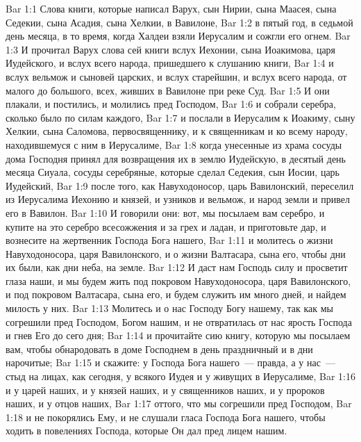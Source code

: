 \vs Bar 1:1 Слова книги, которые написал Варух, сын Нирии, сына Маасея, сына Седекии, сына Асадия, сына Хелкии, в Вавилоне,
\vs Bar 1:2 в пятый год, в седьмой день месяца, в то время, когда Халдеи взяли Иерусалим и сожгли его огнем.
\vs Bar 1:3 И прочитал Варух слова сей книги вслух Иехонии, сына Иоакимова, царя Иудейского, и вслух всего народа, пришедшего к слушанию книги,
\vs Bar 1:4 и вслух вельмож и сыновей царских, и вслух старейшин, и вслух всего народа, от малого до большого, всех, живших в Вавилоне при реке Суд.
\vs Bar 1:5 И они плакали, и постились, и молились пред Господом,
\vs Bar 1:6 и собрали серебра, сколько было по силам каждого,
\vs Bar 1:7 и послали в Иерусалим к Иоакиму, сыну Хелкии, сына Саломова, первосвященнику, и к священникам и ко всему народу, находившемуся с ним в Иерусалиме,
\vs Bar 1:8 когда  унесенные из храма сосуды дома Господня принял для возвращения их в землю Иудейскую, в десятый день месяца Сиуала, сосуды серебряные, которые сделал Седекия, сын Иосии, царь Иудейский,
\vs Bar 1:9 после того, как Навуходоносор, царь Вавилонский, переселил из Иерусалима Иехонию и князей, и узников и вельмож, и народ земли и привел его в Вавилон.
\rsbpar\vs Bar 1:10 И говорили они: вот, мы посылаем вам серебро, и купите на это серебро всесожжения и  за грех и ладан, и приготовьте дар, и вознесите на жертвенник Господа Бога нашего,
\vs Bar 1:11 и молитесь о жизни Навуходоносора, царя Вавилонского, и о жизни Валтасара, сына его, чтобы дни их были, как дни неба, на земле.
\vs Bar 1:12 И даст нам Господь силу и просветит глаза наши, и мы будем жить под покровом Навуходоносора, царя Вавилонского, и под покровом Валтасара, сына его, и будем служить им много дней, и найдем милость у них.
\vs Bar 1:13 Молитесь и о нас Господу Богу нашему, так как мы согрешили пред Господом, Богом нашим, и не отвратилась от нас ярость Господа и гнев Его до сего дня;
\vs Bar 1:14 и прочитайте сию книгу, которую мы посылаем вам, чтобы обнародовать в доме Господнем в день праздничный и в дни нарочитые;
\vs Bar 1:15 и скажите: у Господа Бога нашего~--- правда, а у нас~--- стыд на лицах, как сегодня, у всякого Иудея и у живущих в Иерусалиме,
\vs Bar 1:16 и у царей наших, и у князей наших, и у священников наших, и у пророков наших, и у отцов наших,
\vs Bar 1:17 оттого, что мы согрешили пред Господом,
\vs Bar 1:18 и не покорялись Ему, и не слушали гласа Господа Бога нашего, чтобы ходить в повелениях Господа, которые Он дал пред лицем нашим.
